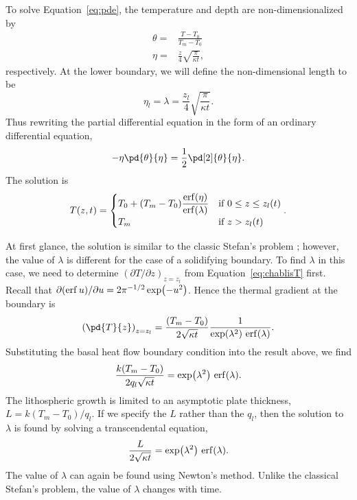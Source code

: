 \documentclass[final,12pt,a4paper]{article}
\begin{document}
To solve Equation~\ref{eq:pde}, the temperature and depth are
non-dimensionalized by
\begin{align*}
    \theta = & \frac{T - T_{0}}{T_{m} - T_{0}} \\
    \eta = & \frac{z}{4} \sqrt{\frac{\pi}{\kappa t}},
\end{align*}
respectively.  At the lower boundary, we will define the non-dimensional length
to be
\begin{equation}
    \eta_l = \lambda = \frac{z_l}{4} \sqrt{\frac{\pi}{\kappa t}}.
    \label{eq:lambda}
\end{equation}
Thus rewriting the partial differential equation in the form of an ordinary
differential equation,
\begin{equation*}
    -\eta \pd{\theta}{\eta} = \frac{1}{2} \pd[2]{\theta}{\eta}.
    \label{eq:ode}
\end{equation*}
The solution is
\begin{equation}
    T(z,t) = 
    \begin{cases}
        T_{0} + (T_{m} - T_{0})
        {\displaystyle \frac{\erf (\eta)}{\erf (\lambda)} } &
        \text{if $0 \leq z \leq z_{l}(t)$} \\
        T_{m} & \text{if $z > z_{l}(t)$}
    \end{cases}.
    \label{eq:chablisT}
\end{equation}

At first glance, the solution is similar to the classic Stefan's problem
\citep{Turcotte&Schubert2002}; however, the value of $\lambda$ is different for
the case of a solidifying boundary.  To find $\lambda$ in this case, we need to
determine $( \partial T / \partial z)_{z=z_{l}}$ from Equation~\ref{eq:chablisT}
first.  Recall that $\partial (\erf u) / \partial u = 2 \pi^{-1/2} \exp
(-u^2)$.  Hence the thermal gradient at the boundary is
\begin{equation*}
    \left( \pd{T}{z} \right)_{z=z_{l}} = 
        \frac{(T_{m} - T_{0})}{2 \sqrt{\kappa t}}
        \frac{1}{\exp (\lambda^2)\, \erf (\lambda)}.
\end{equation*}
Substituting the basal heat flow boundary condition into the result above, we
find
\begin{equation*}
    \frac{k (T_{m} - T_{0})}{2 q_{l} \sqrt{\kappa t}} =
        \exp(\lambda^2)\, \erf (\lambda).
\end{equation*}
The lithospheric growth is limited to an asymptotic plate thickness, $L = k
(T_{m} - T_{0})/q_{l}$.  If we specify the $L$ rather than the $q_{l}$, then the
solution to $\lambda$ is found by solving a transcendental equation,
\begin{equation}
    \frac{L}{2 \sqrt{\kappa t}} = \exp(\lambda^2)\, \erf (\lambda).
    \label{eq:lambdasoln}
\end{equation}
The value of $\lambda$ can again be found using Newton's method.  Unlike the
classical Stefan's problem, the value of $\lambda$ changes with time.
\end{document}
